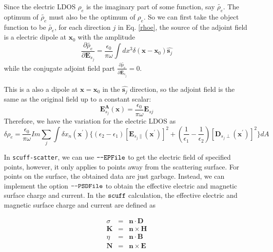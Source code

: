\documentclass[12pt]{article}
\begin{document}
Since the electric LDOS $\rho_e$ is the imaginary part of some function, say $\tilde{\rho_e}$. The optimum of $\tilde{\rho_e}$ must also be the optimum of $\rho_e$. So we can first take the object function to be $\tilde{\rho_e}$, for each direction $j$ in Eq. \eqref{rhoe}, the source of the adjoint field is a electric dipole at $\mathbf{x}_0$ with the amplitude 
\begin{equation}
\frac{\partial \tilde{\rho_e}}{\partial \mathbf{E}_{s_j}} = \frac{\epsilon_0}{\pi\omega}\int dx^3\delta(\mathbf{x}-\mathbf{x}_0)\hat{\mathbf{s}_j}
\end{equation}
while the conjugate adjoint field part $\frac{\partial \tilde{\rho_e}}{\partial \mathbf{\bar{E}}_{s_j}} =0$.

This is a also a dipole at $\mathbf{x}=\mathbf{x}_0$ in the $\hat{\mathbf{s}_j}$ direction, so the adjoint field is the same as the original field up to a constant scalar:
\begin{equation}
\mathbf{E}^\mathbf{A}_{s_j}(\mathbf{x}) = \frac{\epsilon_0}{\pi\omega}\mathbf{E}_{sj}
\end{equation}
Therefore, we have the variation for the electric LDOS as
\begin{equation}
\delta \rho_e =  \frac{\epsilon_0}{\pi\omega}Im\sum_j\int \delta x_n(\mathbf{x}^\prime) \{(\epsilon_2 -\epsilon_1) [\mathbf{E}_{s_j\parallel}(\mathbf{x}^\prime)]^2+ (\frac{1}{\epsilon_1}-\frac{1}{\epsilon_2})[\mathbf{D}_{s_j\perp}(\mathbf{x}^\prime)]^2\}dA\label{fderiv}
\end{equation}

In \verb|scuff-scatter|, we can use $\verb|--EPFile|$ to get the electric field of specified points, however, it only applies to points away from the scattering surface. For points on the surface, the obtained data are just garbage. Instead, we can implement the option $\verb|--PSDFile|$ to obtain the effective electric and magnetic surface charge and current. In the $\verb|scuff|$ calculation, the effective electric and magnetic surface charge and current are defined as

\begin{subequations}
\begin{eqnarray}
\sigma &=& \mathbf{n}\cdot\mathbf{D}\\
\mathbf{K} & =& \mathbf{n}\times\mathbf{H}\\
\eta &=& \mathbf{n}\cdot\mathbf{B}\\
\mathbf{N} & =& \mathbf{n}\times\mathbf{E}
\end{eqnarray}
\end{subequations}
\end{document}
